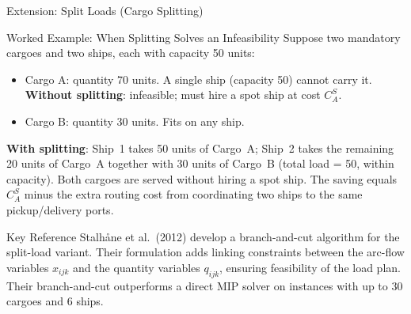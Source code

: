 \documentclass[aspectratio=169,10pt]{beamer}
\begin{document}
\begin{frame}[allowframebreaks]{Extension: Split Loads (Cargo Splitting)}
  \begin{exampleblock}{Worked Example: When Splitting Solves an Infeasibility}
    Suppose two mandatory cargoes and two ships, each with capacity 50 units:
    \begin{itemize}
      \item Cargo A: quantity 70 units.  A single ship (capacity 50) cannot
            carry it.  \textbf{Without splitting}: infeasible; must hire a
            spot ship at cost $C_A^S$.
      \item Cargo B: quantity 30 units.  Fits on any ship.
    \end{itemize}
    \textbf{With splitting}: Ship~1 takes 50 units of Cargo~A; Ship~2 takes
    the remaining 20 units of Cargo~A together with 30 units of Cargo~B
    (total load = 50, within capacity).  Both cargoes are served without
    hiring a spot ship.  The saving equals $C_A^S$ minus the extra routing
    cost from coordinating two ships to the same pickup/delivery ports.
  \end{exampleblock}

  \begin{alertblock}{Key Reference}
    Stalh\aa ne et al.\ (2012) develop a branch-and-cut algorithm for the
    split-load variant.  Their formulation adds linking constraints between
    the arc-flow variables $x_{ijk}$ and the quantity variables $q_{ijk}$,
    ensuring feasibility of the load plan.  Their branch-and-cut outperforms
    a direct MIP solver on instances with up to 30 cargoes and 6 ships.
  \end{alertblock}
\end{frame}
\end{document}
